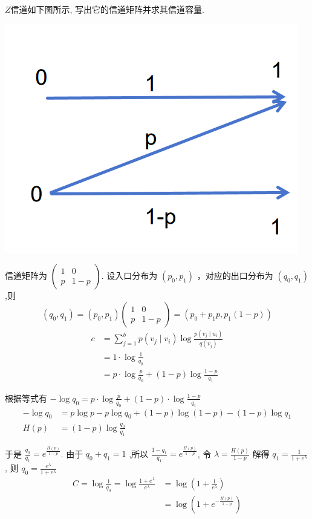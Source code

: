 \newpage
\begin{tcolorbox}[breakable,colback=blue!5!white,colframe=blue!75!black,
 title= 解答题]

$Z$信道如下图所示, 写出它的信道矩阵并求其信道容量.

\begin{center}
    \includegraphics[width=0.2\linewidth]{4.png}
\end{center}


\tcblower

   信道矩阵为 $ \left(\begin{array}{cc}1 & 0 \\ p & 1-p\end{array}\right) $.
设入口分布为 $ \left(p_{0}, p_{1}\right) $ ，对应的出口分布为 $ \left(q_{0}, q_{1}\right) $,则 
$$ \left(q_{0}, q_{1}\right)=\left(p_{0}, p_{1}\right)\left(\begin{array}{cc}1 & 0 \\ p & 1-p\end{array}\right)=\left(p_{0}+p_{1} p, p_{1}(1-p)\right) $$
$$
\begin{aligned}
c & =\sum_{j=1}^{b} p\left(v_{j} \mid v_{i}\right) \log \frac{p\left(v_{j} \mid u_{i}\right)}{q\left(v_{j}\right)} \\
& =1 \cdot \log \frac{1}{q_{0}} \\
& =p \cdot \log \frac{p}{q_{0}}+(1-p) \log \frac{1-p}{q_{1}}
\end{aligned}
$$

根据等式有 $ -\log q_{0}=p \cdot \log \frac{p}{q_{0}}+(1-p) \cdot \log \frac{1-p}{q_{1}} $
$$
\begin{aligned}
-\log q_{0} & =p \log p-p \log q_{0}+(1-p) \log (1-p)-(1-p) \log q_{1} \\
H(p) & =(1-p) \log \frac{q_{0}}{q_{1}}
\end{aligned}
$$

于是 $ \frac{q_{0}}{q_{1}}=e^{\frac{H(p)}{1-p}} $.
由于 $ q_{0}+q_{1}=1 $ ,所以 $ \frac{1-q_{1}}{q_{1}}=e^{\frac{H(p)}{1-p}} $, 令 $ \lambda=\frac{H(p)}{1-p} $
解得 $ q_{1}=\frac{1}{1+e^{\lambda}} $, 则 $ q_{0}=\frac{e^{\lambda}}{1+e^{\lambda}} $
$$
\begin{aligned}
C=\log \frac{1}{q_{0}}=\log \frac{1+e^{\lambda}}{e^{\lambda}} & =\log \left(1+\frac{1}{e^{\lambda}}\right) \\
& =\log \left(1+e^{-\frac{H(p)}{1-p}}\right)
\end{aligned}
$$
    
\end{tcolorbox}